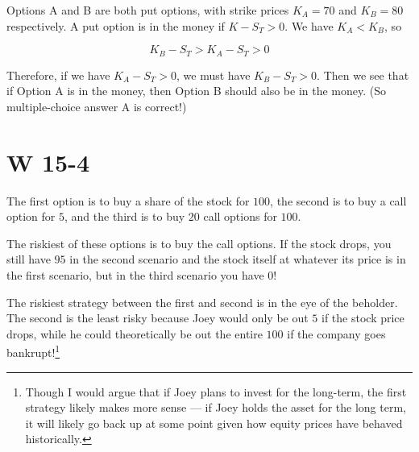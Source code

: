 \documentclass[12pt, letterpaper]{article}
\begin{document}
    Options A and B are both put options, with strike prices \(K_A = 70\) and \(K_B = 80\) respectively. A put option is in the money if \(K - S_T > 0\). We have \(K_A < K_B\), so 
    
    \[ K_B - S_T > K_A - S_T > 0   \]

    Therefore, if we have \(K_A - S_T > 0\), we must have \(K_B - S_T > 0\). Then we see that if Option A is in the money, then Option B should also be in the money. (So multiple-choice answer A is correct!)

    \section{W 15-4}

    The first option is to buy a share of the stock for \(100\), the second is to buy a call option for \(5\), and the third is to buy \(20\) call options for \(100\).

    The riskiest of these options is to buy the call options. If the stock drops, you still have \(95\) in the second scenario and the stock itself at whatever its price is in the first scenario, but in the third scenario you have \(0\)!
    
    The riskiest strategy between the first and second is in the eye of the beholder. The second is the least risky because Joey would only be out \(5\) if the stock price drops, while he could theoretically be out the entire \(100\) if the company goes bankrupt!\footnote{Though I would argue that if Joey plans to invest for the long-term, the first strategy likely makes more sense --- if Joey holds the asset for the long term, it will likely go back up at some point given how equity prices have behaved historically.}
\end{document}
